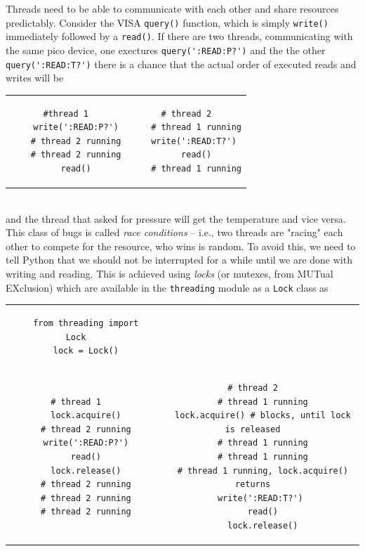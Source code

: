 \documentclass{article}
\newcommand{\ls}[1]{\lstinline{#1}}
\begin{document}
Threads need to be able to communicate with each other and share resources predictably. Consider the VISA \ls{query()} function, which is simply \ls{write()} immediately followed by a \ls{read()}. If there are two threads, communicating with the same pico device, one exectures \ls{query(':READ:P?')} and the the other \ls{query(':READ:T?')} there is a chance that the actual order of executed reads and writes will be
\begin{tabular}{cc}
\begin{lstlisting}[linewidth=0.49\linewidth]
    #thread 1
    write(':READ:P?')
    # thread 2 running
    # thread 2 running
    read()
\end{lstlisting}&
\begin{lstlisting}[linewidth=0.49\linewidth]
    # thread 2
    # thread 1 running
    write(':READ:T?') 
    read()
    # thread 1 running
\end{lstlisting}
\end{tabular}\\
and the thread that asked for pressure will get the temperature and vice versa. This class of bugs is called \emph{race conditions} -- i.e., two threads are "racing" each other to compete for the resource, who wins is random. To avoid this, we need to tell Python that we should not be interrupted for a while until we are done with writing and reading. This is achieved using \emph{locks} (or mutexes, from MUTual EXclusion) which are available in the \ls{threading} module as a \ls{Lock} class as\\
\begin{tabular}{cc}
\begin{lstlisting}
    from threading import Lock
    lock = Lock()
\end{lstlisting}& \\
\begin{lstlisting}[linewidth=0.4\linewidth]
    # thread 1
    lock.acquire()
    # thread 2 running
    write(':READ:P?')
    read()
    lock.release()
    # thread 2 running
    # thread 2 running
    # thread 2 running
\end{lstlisting}&
\begin{lstlisting}[linewidth=0.6\linewidth]
    # thread 2
    # thread 1 running
    lock.acquire() # blocks, until lock is released
    # thread 1 running
    # thread 1 running
    # thread 1 running, lock.acquire() returns
    write(':READ:T?') 
    read()
    lock.release()
\end{lstlisting}
\end{tabular}
\end{document}
